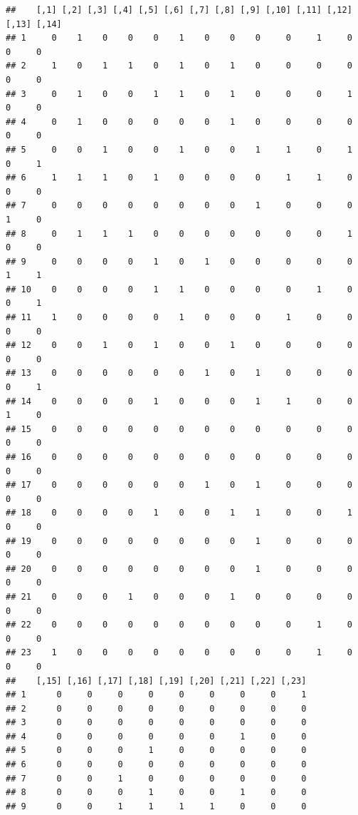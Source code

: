 \documentclass[]{book}
\begin{document}
\begin{verbatim}
##    [,1] [,2] [,3] [,4] [,5] [,6] [,7] [,8] [,9] [,10] [,11] [,12] [,13] [,14]
## 1     0    1    0    0    0    1    0    0    0     0     1     0     0     0
## 2     1    0    1    1    0    1    0    1    0     0     0     0     0     0
## 3     0    1    0    0    1    1    0    1    0     0     0     1     0     0
## 4     0    1    0    0    0    0    0    1    0     0     0     0     0     0
## 5     0    0    1    0    0    1    0    0    1     1     0     1     0     1
## 6     1    1    1    0    1    0    0    0    0     1     1     0     0     0
## 7     0    0    0    0    0    0    0    0    1     0     0     0     1     0
## 8     0    1    1    1    0    0    0    0    0     0     0     1     0     0
## 9     0    0    0    0    1    0    1    0    0     0     0     0     1     1
## 10    0    0    0    0    1    1    0    0    0     0     1     0     0     1
## 11    1    0    0    0    0    1    0    0    0     1     0     0     0     0
## 12    0    0    1    0    1    0    0    1    0     0     0     0     0     0
## 13    0    0    0    0    0    0    1    0    1     0     0     0     0     1
## 14    0    0    0    0    1    0    0    0    1     1     0     0     1     0
## 15    0    0    0    0    0    0    0    0    0     0     0     0     0     0
## 16    0    0    0    0    0    0    0    0    0     0     0     0     0     0
## 17    0    0    0    0    0    0    1    0    1     0     0     0     0     0
## 18    0    0    0    0    1    0    0    1    1     0     0     1     0     0
## 19    0    0    0    0    0    0    0    0    1     0     0     0     0     0
## 20    0    0    0    0    0    0    0    0    1     0     0     0     0     0
## 21    0    0    0    1    0    0    0    1    0     0     0     0     0     0
## 22    0    0    0    0    0    0    0    0    0     0     1     0     0     0
## 23    1    0    0    0    0    0    0    0    0     0     1     0     0     0
##    [,15] [,16] [,17] [,18] [,19] [,20] [,21] [,22] [,23]
## 1      0     0     0     0     0     0     0     0     1
## 2      0     0     0     0     0     0     0     0     0
## 3      0     0     0     0     0     0     0     0     0
## 4      0     0     0     0     0     0     1     0     0
## 5      0     0     0     1     0     0     0     0     0
## 6      0     0     0     0     0     0     0     0     0
## 7      0     0     1     0     0     0     0     0     0
## 8      0     0     0     1     0     0     1     0     0
## 9      0     0     1     1     1     1     0     0     0

\end{verbatim}
\end{document}
